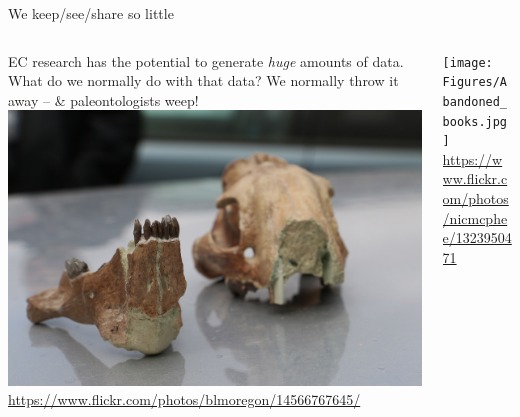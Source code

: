 \documentclass{beamer}
\newcommand{\linespace}{\vskip 0.25cm}
\begin{document}
\begin{frame}{We keep/see/share so little}
	
	\begin{columns}
		\begin{column}{0.6 \linewidth}
			EC research has the potential to generate \emph{huge} amounts of data.
			\linespace
			What do we normally do with that data?
			\linespace
			We normally throw it away -- \& paleontologists weep!
			\linespace
			\includegraphics[width = 0.8 \linewidth]{Figures/FossilsMedium.jpg} \\
			\tiny{\url{https://www.flickr.com/photos/blmoregon/14566767645/}}
		\end{column}
		\begin{column}{0.4 \linewidth}
			\texttt{[image: Figures/Abandoned\_books.jpg]} \\
			\tiny{\url{https://www.flickr.com/photos/nicmcphee/1323950471}}
		\end{column}
	\end{columns}
\end{frame}
\end{document}
